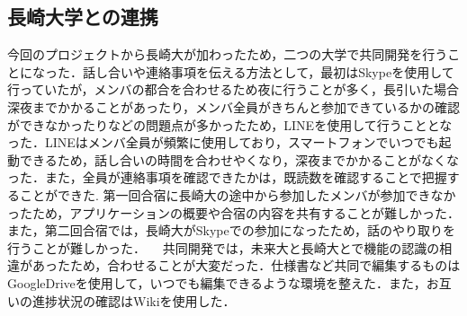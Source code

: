 \subsection{長崎大学との連携}
 今回のプロジェクトから長崎大が加わったため，二つの大学で共同開発を行うことになった．話し合いや連絡事項を伝える方法として，最初はSkypeを使用して行っていたが，メンバの都合を合わせるため夜に行うことが多く，長引いた場合深夜までかかることがあったり，メンバ全員がきちんと参加できているかの確認ができなかったりなどの問題点が多かったため，LINEを使用して行うこととなった．LINEはメンバ全員が頻繁に使用しており，スマートフォンでいつでも起動できるため，話し合いの時間を合わせやくなり，深夜までかかることがなくなった．また，全員が連絡事項を確認できたかは，既読数を確認することで把握することができた.
 第一回合宿に長崎大の途中から参加したメンバが参加できなかったため，アプリケーションの概要や合宿の内容を共有することが難しかった．また，第二回合宿では，長崎大がSkypeでの参加になったため，話のやり取りを行うことが難しかった．
　共同開発では，未来大と長崎大とで機能の認識の相違があったため，合わせることが大変だった．仕様書など共同で編集するものはGoogleDriveを使用して，いつでも編集できるような環境を整えた．また，お互いの進捗状況の確認はWikiを使用した．
